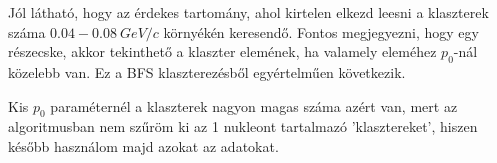 \documentclass[a4paper,12pt]{article}
\begin{document}
\par Jól látható, hogy az érdekes tartomány, ahol kirtelen elkezd leesni a klaszterek száma $0.04 - 0.08 ~GeV/c$ környékén keresendő. Fontos megjegyezni, hogy egy részecske, akkor tekinthető a klaszter elemének, ha valamely eleméhez $p_{0}$-nál közelebb van. Ez a BFS klaszterezésből egyértelműen következik. 

\par Kis $p_{0}$ paraméternél a klaszterek nagyon magas száma azért van, mert az algoritmusban nem szűröm ki az 1 nukleont tartalmazó 'klasztereket', hiszen később használom majd azokat az adatokat.
\end{document}

